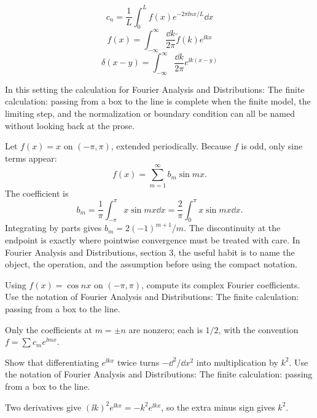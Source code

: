 \[
  c_n=\frac1L\int_0^L f(x)e^{-2\pi\ii nx/L}\dd x
\]
\[
  f(x)=\int_{-\infty}^{\infty}\frac{\dd k}{2\pi}\tilde f(k)e^{\ii kx}
\]
\[
  \delta(x-y)=\int_{-\infty}^{\infty}\frac{\dd k}{2\pi}e^{\ii k(x-y)}
\]

In this setting the calculation for Fourier Analysis and Distributions: The finite calculation: passing from a box to the line is complete when the finite model, the limiting step, and the normalization or boundary condition can all be named without looking back at the prose.




\begin{example}
Let \(f(x)=x\) on \((-\pi,\pi)\), extended periodically.  Because \(f\) is odd, only sine terms appear:
\[
  f(x)=\sum_{m=1}^\infty b_m\sin mx.
\]
The coefficient is
\[
  b_m=\frac1\pi\int_{-\pi}^\pi x\sin mx\dd x
  =\frac2\pi\int_0^\pi x\sin mx\dd x.
\]
Integrating by parts gives \(b_m=2(-1)^{m+1}/m\).  The discontinuity at the endpoint is exactly where pointwise convergence must be treated with care.  In Fourier Analysis and Distributions, section 3, the useful habit is to name the object, the operation, and the assumption before using the compact notation.
\end{example}



\begin{exercise}
Using \(f(x)=\cos nx\) on \((-\pi,\pi)\), compute its complex Fourier coefficients.  Use the notation of Fourier Analysis and Distributions: The finite calculation: passing from a box to the line.
\begin{answer}
Only the coefficients at \(m=\pm n\) are nonzero; each is \(1/2\), with the convention \(f=\sum c_me^{\ii mx}\).
\end{answer}
\end{exercise}

\begin{exercise}
Show that differentiating \(e^{\ii kx}\) twice turns \(-\dd^2/\dd x^2\) into multiplication by \(k^2\).  Use the notation of Fourier Analysis and Distributions: The finite calculation: passing from a box to the line.
\begin{answer}
Two derivatives give \((\ii k)^2e^{\ii kx}=-k^2e^{\ii kx}\), so the extra minus sign gives \(k^2\).
\end{answer}
\end{exercise}



